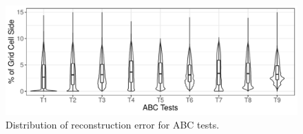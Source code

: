 \begin{figure}[!t]
\centering
\includegraphics[width=\linewidth]{Images/ABC_Tests.pdf}
\caption{Distribution of reconstruction error for ABC tests.}
\label{fig:abc_plot}
\end{figure}
